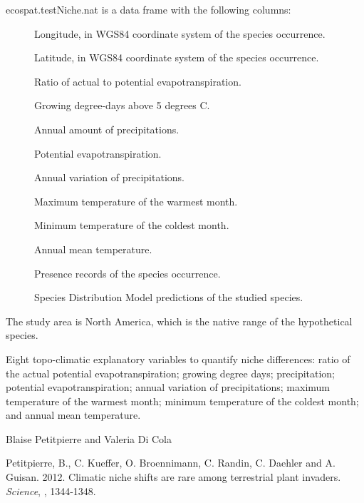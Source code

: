 \documentclass[a4paper]{book}
\begin{document}
\begin{Format}
ecospat.testNiche.nat is a data frame with the following columns:
\begin{description}

\item[] Longitude, in WGS84 coordinate system of the species occurrence.
\item[] Latitude, in WGS84 coordinate system of the species occurrence.
\item[] Ratio of actual to potential evapotranspiration.
\item[] Growing degree-days above 5 degrees C.
\item[] Annual amount of precipitations.
\item[] Potential evapotranspiration.
\item[] Annual variation of precipitations.
\item[] Maximum temperature of the warmest month.
\item[] Minimum temperature of the coldest month.
\item[] Annual mean temperature.
\item[] Presence records of the species occurrence.
\item[] Species Distribution Model predictions of the studied species.

\end{description}

\end{Format}
%
\begin{Details}\relax
The study area is North America, which is the native range of the hypothetical species.

Eight topo-climatic explanatory variables to quantify niche differences: ratio of the actual potential evapotranspiration; growing degree days; precipitation; potential evapotranspiration; annual variation of precipitations; maximum temperature of the warmest month; minimum temperature of the coldest month; and annual mean temperature.
\end{Details}
%
\begin{Author}\relax
Blaise Petitpierre  and Valeria Di Cola 
\end{Author}
%
\begin{References}\relax
Petitpierre, B., C. Kueffer, O. Broennimann, C. Randin, C. Daehler and A. Guisan. 2012. Climatic niche shifts are rare among terrestrial plant invaders. \emph{Science}, , 1344-1348.
\end{References}
\end{document}
